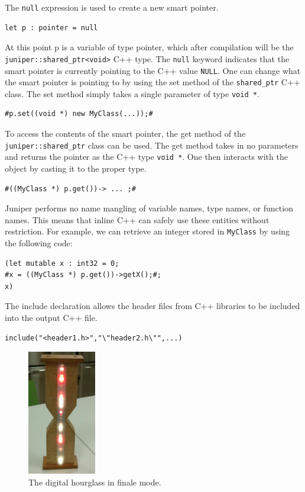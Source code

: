 \documentclass{sigplanconf}
\begin{document}
The \texttt{null} expression is used to create a new smart pointer.
\begin{verbatim}
let p : pointer = null
\end{verbatim}
At this point p is a variable of type pointer, which after compilation will be the \texttt{juniper::shared_ptr<void>} C++ type. The \texttt{null} keyword indicates that the smart pointer is currently pointing to the C++ value \texttt{NULL}. One can change what the smart pointer is pointing to by using the set method of the \texttt{shared_ptr} C++ class. The set method simply takes a single parameter of type \texttt{void *}.
\begin{verbatim}
#p.set((void *) new MyClass(...));#
\end{verbatim}
To access the contents of the smart pointer, the get method of the \texttt{juniper::shared_ptr} class can be used. The get method takes in no parameters and returns the pointer as the C++ type \texttt{void *}. One then interacts with the object by casting it to the proper type.
\begin{verbatim}
#((MyClass *) p.get())-> ... ;#
\end{verbatim}
Juniper performs no name mangling of variable names, type names, or function names. This means that inline C++ can safely use these entities without restriction. For example, we can retrieve an integer stored in \texttt{MyClass} by using the following code:
\begin{verbatim}
(let mutable x : int32 = 0;
#x = ((MyClass *) p.get())->getX();#;
x)
\end{verbatim}

The include declaration allows the header files from C++ libraries to be included into the output C++ file.
\begin{verbatim}
include("<header1.h>","\"header2.h\"",...)
\end{verbatim}

\begin{figure}
\centering
\includegraphics[width=3cm]{timer}
\caption{The digital hourglass in finale mode.}
\label{fig:digitalhourglass}
\end{figure}
\end{document}
